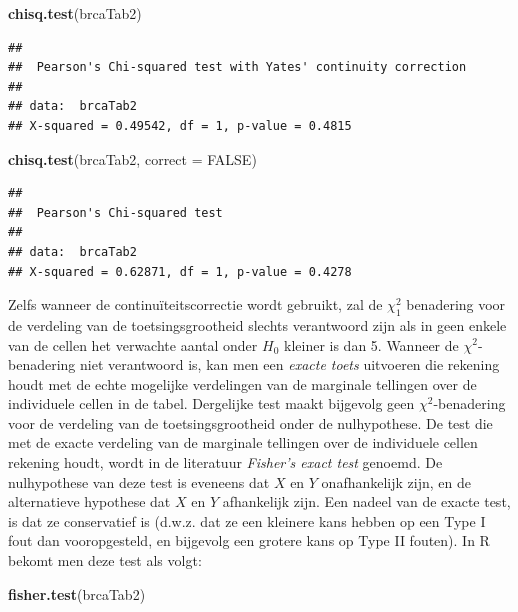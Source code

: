 \documentclass[
  12pt,dutch]{book}
\newenvironment{Shaded}{\begin{snugshade}}{\end{snugshade}}
\newcommand{\AttributeTok}[1]{\textcolor[rgb]{0.13,0.29,0.53}{#1}}
\newcommand{\ConstantTok}[1]{\textcolor[rgb]{0.56,0.35,0.01}{#1}}
\newcommand{\FunctionTok}[1]{\textcolor[rgb]{0.13,0.29,0.53}{\textbf{#1}}}
\newcommand{\NormalTok}[1]{#1}
\theoremstyle{definition}
\theoremstyle{definition}
\theoremstyle{definition}
\theoremstyle{definition}
\theoremstyle{remark}
\begin{document}
\begin{Shaded}
\begin{Highlighting}[]
\FunctionTok{chisq.test}\NormalTok{(brcaTab2)}
\end{Highlighting}
\end{Shaded}

\begin{verbatim}
## 
##  Pearson's Chi-squared test with Yates' continuity correction
## 
## data:  brcaTab2
## X-squared = 0.49542, df = 1, p-value = 0.4815
\end{verbatim}

\begin{Shaded}
\begin{Highlighting}[]
\FunctionTok{chisq.test}\NormalTok{(brcaTab2, }\AttributeTok{correct =} \ConstantTok{FALSE}\NormalTok{)}
\end{Highlighting}
\end{Shaded}

\begin{verbatim}
## 
##  Pearson's Chi-squared test
## 
## data:  brcaTab2
## X-squared = 0.62871, df = 1, p-value = 0.4278
\end{verbatim}

Zelfs wanneer de continuïteitscorrectie wordt gebruikt, zal de \(\chi^2_1\) benadering voor de verdeling van de toetsingsgrootheid slechts
verantwoord zijn als in geen enkele van de cellen het verwachte aantal onder
\(H_0\) kleiner is dan 5. Wanneer de \(\chi^2\)-benadering niet verantwoord
is, kan men een \emph{exacte toets} uitvoeren die rekening houdt met de
echte mogelijke verdelingen van de marginale tellingen over de individuele
cellen in de tabel. Dergelijke test maakt bijgevolg geen \(\chi^2\)-benadering voor de verdeling van de toetsingsgrootheid onder de
nulhypothese. De test die met de exacte verdeling van de marginale tellingen
over de individuele cellen rekening houdt, wordt in de literatuur \emph{Fisher's exact test} genoemd.
De nulhypothese van deze test is eveneens dat \(X\) en \(Y\) onafhankelijk zijn, en de alternatieve hypothese dat \(X\) en \(Y\)
afhankelijk zijn. Een nadeel van de exacte test, is dat ze conservatief
is (d.w.z. dat ze een kleinere kans hebben op een Type I fout dan
vooropgesteld, en bijgevolg een grotere kans op Type II fouten). In R bekomt men deze test als volgt:

\begin{Shaded}
\begin{Highlighting}[]
\FunctionTok{fisher.test}\NormalTok{(brcaTab2)}
\end{Highlighting}
\end{Shaded}
\end{document}
